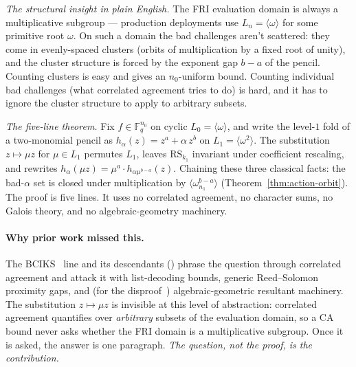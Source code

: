 \documentclass[11pt]{article}
\theoremstyle{definition}
\theoremstyle{remark}
\newcommand{\FF}{\mathbb{F}}
\newcommand{\RS}{\mathrm{RS}}
\begin{document}
\emph{The structural insight in plain English.} The FRI evaluation
domain is
always a multiplicative subgroup --- production deployments use
$L_n = \langle\omega\rangle$ for some primitive root $\omega$. On
such a domain the bad challenges aren't scattered: they come in
evenly-spaced clusters (orbits of multiplication by a fixed root of
unity), and the cluster structure is forced by the exponent gap
$b - a$ of the pencil. Counting clusters is easy and gives an
$n_0$-uniform bound. Counting individual bad challenges (what
correlated agreement tries to do) is hard, and it has to ignore
the cluster structure to apply to arbitrary subsets.

\smallskip\noindent
\emph{The five-line theorem.} Fix $f \in \FF_q^{n_0}$ on cyclic
$L_0 = \langle\omega\rangle$, and write the level-$1$ fold of a
two-monomial pencil as $h_\alpha(z) = z^a + \alpha\, z^b$ on
$L_1 = \langle\omega^2\rangle$. The substitution $z \mapsto \mu z$
for $\mu \in L_1$ permutes $L_1$, leaves $\RS_{k_1}$ invariant
under coefficient rescaling, and rewrites
$h_\alpha(\mu z) = \mu^a \cdot h_{\alpha \mu^{b-a}}(z)$. Chaining
these three classical facts: the bad-$\alpha$ set is closed under
multiplication by $\langle\omega_{n_1}^{b-a}\rangle$
(Theorem~\ref{thm:action-orbit}). The proof is five lines. It uses
no correlated agreement, no character sums, no Galois theory, and
no algebraic-geometry machinery.

\paragraph{Why prior work missed this.}
The BCIKS~\cite{BCIKS} line and its descendants
(\cite{Paper1,CritesStewart2025}) phrase the question through
correlated agreement and attack it with list-decoding bounds, generic
Reed--Solomon proximity gaps, and (for the
disproof~\cite{CritesStewart2025}) algebraic-geometric resultant
machinery. The substitution $z \mapsto \mu z$ is invisible at this
level of abstraction: correlated agreement quantifies over
\emph{arbitrary} subsets of the evaluation domain, so a CA bound never
asks whether the FRI domain is a multiplicative subgroup. Once it is
asked, the answer is one paragraph. \emph{The question, not the proof,
is the contribution.}
\end{document}
